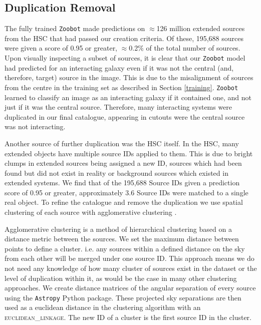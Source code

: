\subsection{Duplication Removal}\label{dup_rem}
\noindent The fully trained \texttt{Zoobot} made predictions on $\approx$126 million extended sources from the HSC that had passed our creation criteria. Of these, 195,688 sources were given a score of 0.95 or greater, $\approx$0.2\% of the total number of sources. Upon visually inspecting a subset of sources, it is clear that our \texttt{Zoobot} model had predicted for an interacting galaxy even if it was not the central (and, therefore, target) source in the image. This is due to the misalignment of sources from the centre in the training set as described in Section \ref{training}. \texttt{Zoobot} learned to classify an image as an interacting galaxy if it contained one, and not just if it was the central source. Therefore, many interacting systems were duplicated in our final catalogue, appearing in cutouts were the central source was not interacting.

Another source of further duplication was the HSC itself. In the HSC, many extended objects have multiple source IDs applied to them. This is due to bright clumps in extended sources being assigned a new ID, sources which had been found but did not exist in reality or background sources which existed in extended systems. We find that of the 195,688 Source IDs given a prediction score of 0.95 or greater, approximately 3.6 Source IDs were matched to a single real object. To refine the catalogue and remove the duplication we use spatial clustering of each source with agglomerative clustering \citep[an introduction and description of hierarchical clustering, including agglomerative clustering, can be found in][]{nielsen16}.

Agglomerative clustering is a method of hierarchical clustering based on a distance metric between the sources. We set the maximum distance between points to define a cluster. i.e. any sources within a defined distance on the sky from each other will be merged under one source ID. This approach means we do not need any knowledge of how many cluster of sources exist in the dataset or the level of duplication within it, as would be the case in many other clustering approaches. We create distance matrices of the angular separation of every source using the \texttt{Astropy} Python package. These projected sky separations are then used as a euclidean distance in the clustering algorithm with an \textsc{euclidean\_linkage}. The new ID of a cluster is the first source ID in the cluster. 

